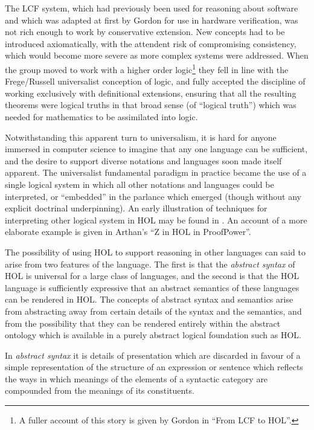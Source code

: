 \documentclass[10pt,titlepage]{book}
\begin{document}
The LCF system, which had previously been used for reasoning about software and which was adapted at first by Gordon for use in hardware verification, was not rich enough to work by conservative extension.
New concepts had to be introduced axiomatically, with the attendent risk of compromising consistency, which would become more severe as more complex systems were addressed.
When the group moved to work with a higher order logic\footnote{A fuller account of this story is given by Gordon in ``From LCF to HOL''\cite{gordon2000lcf}.} they fell in line with the Frege/Russell universalist conception of logic, and fully accepted the discipline of working exclusively with definitional  extensions, ensuring that all the resulting theorems were logical truths in that broad sense (of ``logical truth'') which was needed for mathematics to be assimilated into logic.

Notwithstanding this apparent turn to universalism, it is hard for anyone immersed in computer science to imagine that any one language can be sufficient, and the desire to support diverse notations and languages soon made itself apparent.
The universalist fundamental paradigm in practice became the use of a single logical system in which all other notations and languages could be interpreted, or ``embedded'' in the parlance which emerged (though without any explicit doctrinal underpinning).
An early illustration of techniques for interpreting other logical system in HOL may be found in \cite{gordon1989mechanizing}.
An account of a more elaborate example is given in Arthan's ``Z in HOL in ProofPower''\cite{arthan2005}.

The possibility of using HOL to support reasoning in other languages can said to arise from two features of the language.
The first is that the \emph{abstract syntax} of HOL is universal for a large class of languages, and the second is that the HOL language is sufficiently expressive that an abstract semantics of these languages can be rendered in HOL.
The concepts of abstract syntax and semantics arise from abstracting away from certain details of the syntax and the semantics, and from the possibility that they can be rendered entirely within the abstract ontology which is available in a purely abstract logical foundation such as HOL.

In \emph{abstract syntax} it is details of presentation which are discarded in favour of a simple representation of the structure of an expression or sentence which reflects the ways in which meanings of the elements of a syntactic category are compounded from the meanings of its constituents.
\end{document}
